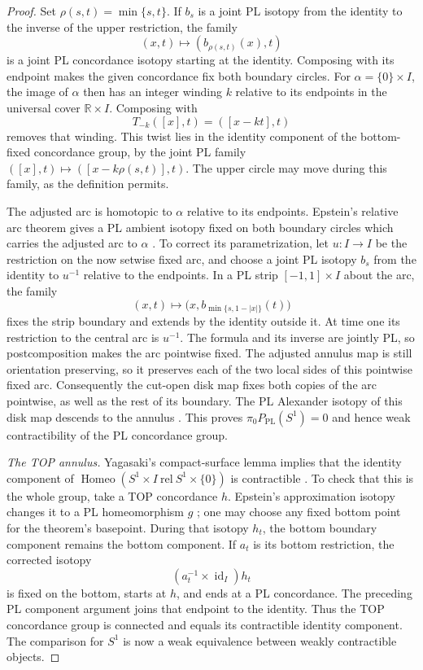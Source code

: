 \begin{proof}
Set $\rho(s,t)=\min\{s,t\}$.  If $b_s$ is a joint PL isotopy from
the identity to the inverse of the upper restriction, the family
\[
                    (x,t)\longmapsto(b_{\rho(s,t)}(x),t)
\]
is a joint PL concordance isotopy starting at the identity.  Composing
with its endpoint makes the given concordance fix both boundary
circles.  For $\alpha=\{0\}\times I$, the image of $\alpha$ then
has an integer winding $k$ relative to its endpoints in the universal
cover $\mathbb R\times I$.  Composing with
\[
 T_{-k}([x],t)=([x-kt],t)
\]
removes that winding.  This twist lies in the identity component
of the bottom-fixed concordance group, by the joint PL family
$([x],t)\mapsto([x-k\rho(s,t)],t)$.  The upper circle may move
during this family, as the definition permits.

The adjusted arc is homotopic to $\alpha$ relative to its endpoints.
Epstein's relative arc theorem gives a PL ambient isotopy fixed on
both boundary circles which carries the adjusted arc to $\alpha$
\cite[Theorem~3.1 and proof, pp.~89--90]{Epstein1966}.
To correct its parametrization, let $u:I\to I$ be the restriction
on the now setwise fixed arc, and choose a joint PL isotopy $b_s$
from the identity to $u^{-1}$ relative to the endpoints.  In a PL
strip $[-1,1]\times I$ about the arc, the family
\[
 (x,t)\longmapsto\bigl(x,b_{\min\{s,1-|x|\}}(t)\bigr)
\]
fixes the strip boundary and extends by the identity outside it.
At time one its restriction to the central arc is $u^{-1}$.
The formula and its inverse are jointly PL, so postcomposition
makes the arc pointwise fixed.
The adjusted annulus map is still orientation preserving, so it preserves
each of the two local sides of this pointwise fixed arc.  Consequently the
cut-open disk map fixes both copies of the arc pointwise, as well as the
rest of its boundary.
The PL Alexander isotopy of this disk map descends to the annulus
\cite[Theorem~5.2 and proof, pp.~95--96]{Epstein1966}.
This proves $\pi_0P_{\mathrm{PL}}(S^1)=0$ and hence weak
contractibility of the PL concordance group.

\medskip\noindent\textit{The TOP annulus.}
Yagasaki's compact-surface lemma implies that the identity component
of $\operatorname{Homeo}(S^1\times I\ \mathrm{rel}\ S^1\times\{0\})$
is contractible
\cite[Lemma~2.1(ii), p.~2, and proof, p.~3, author version]{Yagasaki2000}.
To check that this is the whole group, take a TOP concordance $h$.
Epstein's approximation isotopy changes it to a PL homeomorphism
$g$ \cite[Theorem~A4 and proof, p.~107]{Epstein1966}; one may choose
any fixed bottom point for the theorem's basepoint.  During that
isotopy $h_t$, the bottom boundary component remains the bottom
component.  If $a_t$ is its bottom restriction, the corrected isotopy
\[
                   (a_t^{-1}\times\operatorname{id}_I)h_t
\]
is fixed on the bottom, starts at $h$, and ends at a PL concordance.
The preceding PL component argument joins that endpoint to the
identity.  Thus the TOP concordance group is connected and equals
its contractible identity component.  The comparison for $S^1$
is now a weak equivalence between weakly contractible objects.


\end{proof}
